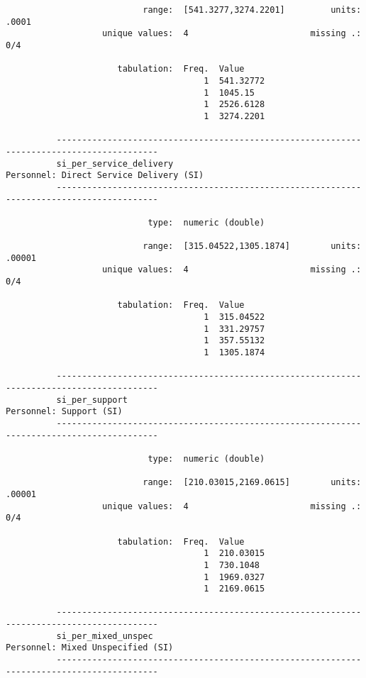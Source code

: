 \documentclass{article}
\begin{document}
\begin{verbatim}
                           range:  [541.3277,3274.2201]         units:  .0001
                   unique values:  4                        missing .:  0/4
          
                      tabulation:  Freq.  Value
                                       1  541.32772
                                       1  1045.15
                                       1  2526.6128
                                       1  3274.2201
          
          ------------------------------------------------------------------------------------------
          si_per_service_delivery                            Personnel: Direct Service Delivery (SI)
          ------------------------------------------------------------------------------------------
          
                            type:  numeric (double)
          
                           range:  [315.04522,1305.1874]        units:  .00001
                   unique values:  4                        missing .:  0/4
          
                      tabulation:  Freq.  Value
                                       1  315.04522
                                       1  331.29757
                                       1  357.55132
                                       1  1305.1874
          
          ------------------------------------------------------------------------------------------
          si_per_support                                                     Personnel: Support (SI)
          ------------------------------------------------------------------------------------------
          
                            type:  numeric (double)
          
                           range:  [210.03015,2169.0615]        units:  .00001
                   unique values:  4                        missing .:  0/4
          
                      tabulation:  Freq.  Value
                                       1  210.03015
                                       1  730.1048
                                       1  1969.0327
                                       1  2169.0615
          
          ------------------------------------------------------------------------------------------
          si_per_mixed_unspec                                      Personnel: Mixed Unspecified (SI)
          ------------------------------------------------------------------------------------------
          

\end{verbatim}
\end{document}
